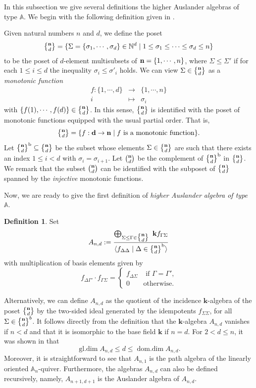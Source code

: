 \documentclass{amsart}
\newcommand{\A}{\mathbb{A}}
\newcommand{\N}{\mathbb{N}}
\newcommand{\bk}{\mathbf{k}}
\theoremstyle{plain}
\theoremstyle{definition}
\newtheorem{Def}[Thm]{Definition}
\numberwithin{equation}{section}
\newcommand{\multiset}[2]{\genfrac{\{}{\}}{0pt}{1}{#1}{#2}}
\begin{document}
In this subsection we give several definitions the higher Auslander algebras of type $\mathbb{A}$. We begin with the following definition given in \cite{DyckerhoffJassoLekili21}. 

Given natural numbers  $n$ and $d$, we define the poset 
\[
\multiset{{\bf n}}{d}=\{\Sigma=\{\sigma_1,\cdots,\sigma_d\}\in \N^d\mid 1\le \sigma_1\le\cdots\le \sigma_d\le n\}
\]
to be the poset of $d$-element multisubsets of ${\bf n}=\{1,\cdots,n\}$, where $\Sigma\le \Sigma'$ if for each $1\le i\le d$ the inequality $\sigma_i\le\sigma'_i$ holds.  We can view $\Sigma\in \multiset{\bf n}{d}$ as a {\it monotonic function} 
\[\begin{array}{ccc}
    f:\{1,\cdots,d\} & \longrightarrow & \{1,\cdots,n\} \\
     i & \mapsto & \sigma_i
\end{array}\]
with $\{f(1),\cdots,f(d)\} \in \multiset{\bf n}{d}$. In this sense, $\multiset{\bf n}{d}$ is identified with the poset of monotonic functions equipped with the usual partial order. That is, \[\multiset{\bf n}{d}=\{f:{\bf d}\to {\bf n} \mid f \text{ is a monotonic function}\}.\]
Let $\multiset{\bf n}{d}^{\mathrm{b}}\subseteq \multiset{\bf n}{d}$  be the subset whose elements  $\Sigma\in\multiset{\bf n}{d}$ are such that there exists an index $1\le i<d$ with $\sigma_i=\sigma_{i+1}$. Let 
$\binom{\bf n}{d}$ be the complement of $\multiset{\bf n}{d}^{\mathrm{b}}$ in $\multiset{\bf n}{d}$. We remark that the subset $\binom{\bf n}{d}$ can be identified with the subposet of $\multiset{\bf n}{d}$ spanned by the {\it injective} monotonic functions.  

Now, we are ready to give the first definition of  {\it higher Auslander algebra of type $\A$}. 

\begin{Def}\label{def1}
    Set  
\begin{equation*}
    A_{n,d}:=\frac{\bigoplus_{\Sigma\le\Gamma\in\multiset{\bf n}{d}}\ \bk f_{\Gamma\Sigma}}{\langle f_{\Delta\Delta}\mid \Delta\in \multiset{\bf n}{d}^{\mathrm{b}} \rangle}
\end{equation*}
with multiplication of basis elements given by \[ f_{\Delta\Gamma'}\cdot f_{\Gamma\Sigma}=\begin{cases}
    f_{\Delta\Sigma} & \text{ if $\Gamma=\Gamma'$,}\\ 0 & \text{otherwise.}
\end{cases}\]
\end{Def}

Alternatively, we can define  $A_{n,d}$ as the quotient of the incidence $\bk$-algebra of the poset $\multiset{\bf n}{d}$ by the two-sided ideal generated by the idempotents $f_{\Sigma\Sigma}$, for all $\Sigma\in \multiset{\bf n}{d}^b$. It follows directly from the definition that the $\bk$-algebra $A_{n,d}$ vanishes if $n<d$ and that it is isomorphic to the base field $\bk$ if $n=d$. For $2<d\le n$, it was shown in \cite{Iyama11} that  \[\operatorname{gl.dim}A_{n,d}\le d\le \operatorname{dom.dim}A_{n,d}.\] Moreover, it is straightforward to see that $A_{n,1}$ is the path algebra of the linearly oriented $\mathbb{A}_n$-quiver. Furthermore, the algebras $A_{n,d}$ can also be defined recursively, namely,  $A_{n+1,d+1}$ is the Auslander algebra of $A_{n,d}$.
\end{document}
